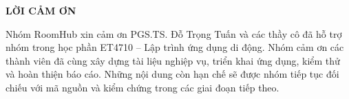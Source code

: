 \documentclass[../DoAn.tex]{subfiles}
\begin{document}
\begin{center}\bfseries\large LỜI CẢM ƠN\end{center}
\vspace{0.5cm}
Nhóm RoomHub xin cảm ơn PGS.TS. Đỗ Trọng Tuấn và các thầy cô đã hỗ trợ nhóm trong học phần ET4710 -- Lập trình ứng dụng di động. Nhóm cảm ơn các thành viên đã cùng xây dựng tài liệu nghiệp vụ, triển khai ứng dụng, kiểm thử và hoàn thiện báo cáo. Những nội dung còn hạn chế sẽ được nhóm tiếp tục đối chiếu với mã nguồn và kiểm chứng trong các giai đoạn tiếp theo.
\end{document}
